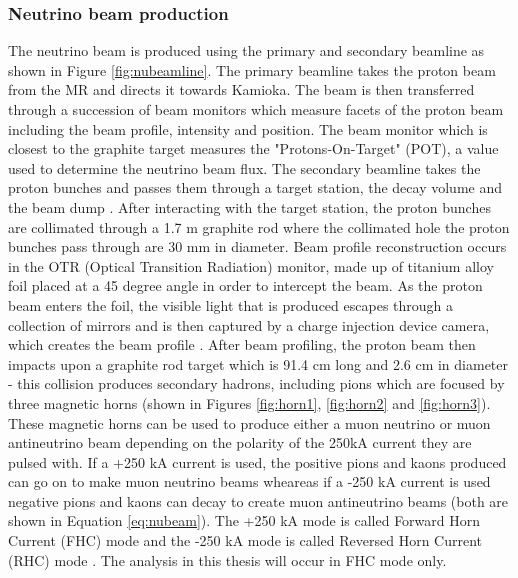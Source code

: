 \subsubsection{Neutrino beam production}

The neutrino beam is produced using the primary and secondary beamline as shown in Figure \ref{fig:nubeamline}. The primary beamline takes the proton beam from the MR and directs it towards Kamioka. The beam is then transferred through a succession of beam monitors which measure facets of the proton beam including the beam profile, intensity and position. The beam monitor which is closest to the graphite target measures the "Protons-On-Target" (POT), a value used to determine the neutrino beam flux. The secondary beamline takes the proton bunches and passes them through a target station, the decay volume and the beam dump \cite{sekiguchi2008neutrino}. After interacting with the target station, the proton bunches are collimated through a 1.7 m graphite rod where the collimated hole the proton bunches pass through are 30 mm in diameter. Beam profile reconstruction occurs in the OTR (Optical Transition Radiation) monitor, made up of titanium alloy foil placed at a 45 degree angle in order to intercept the beam. As the proton beam enters the foil, the visible light that is produced escapes through a collection of mirrors and is then captured by a charge injection device camera, which creates the beam profile \cite{bhadra2013optical}. 
\newline
After beam profiling, the proton beam then impacts upon a graphite rod target which is 91.4 cm long and 2.6 cm in diameter - this collision produces secondary hadrons, including pions which are focused by three magnetic horns (shown in Figures \ref{fig:horn1}, \ref{fig:horn2} and \ref{fig:horn3}). These magnetic horns can be used to produce either a muon neutrino or muon antineutrino beam depending on the polarity of the 250kA current they are pulsed with. If a +250 kA current is used, the positive pions and kaons produced can go on to make muon neutrino beams wheareas if a -250 kA current is used negative pions and kaons can decay to create muon antineutrino beams (both are shown in Equation \ref{eq:nubeam}). The +250 kA mode is called Forward Horn Current (FHC) mode and the -250 kA mode is called Reversed Horn Current (RHC) mode \cite{sekiguchi2008t2k}. The analysis in this thesis will occur in FHC mode only. 


